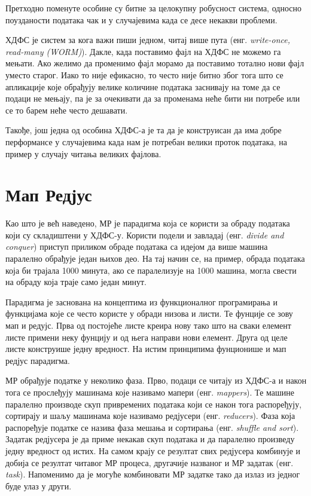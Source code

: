 \documentclass[12pt,oneside]{memoir}
\begin{document}
Претходно поменуте особине су битне за целокупну робусност система, односно поузданости података чак и у случајевима када се десе некакви проблеми.

ХДФС је систем за кога важи пиши једном, читај више пута (енг. \textit{write-once, read-many (WORM)}). Дакле, када поставимо фајл на ХДФС не можемо га мењати. Ако желимо да променимо фајл морамо да поставимо тотално нови фајл уместо старог. Иако то није ефикасно, то често није битно због тога што се апликације које обрађују велике количине података заснивају на томе да се подаци не мењају, па је за очекивати да за променама неће бити ни потребе или се то барем неће често дешавати. \cite{hadoop_beginner}


Такође, још једна од особина ХДФС-а је та да је конструисан да има добре перформансе у случајевима када нам је потребан велики проток података, на пример у случају читања великих фајлова. \cite{hadoop_beginner}


\section{Мап Редјус}
\label{sec:mr}

Као што је већ наведено, МР је парадигма која се користи за обраду података који су складиштени у ХДФС-у. Користи подели и завладај (енг. \textit{divide and conquer}) приступ приликом обраде података са идејом да више машина паралелно обрађује један њихов део. На тај начин се, на пример, обрада података која би трајала 1000 минута, ако се паралелизује на 1000 машина, могла свести на обраду која траје само један минут. \cite{hadoop_beginner}

Парадигма је заснована на концептима из функционалног програмирања и функцијама које се често користе у обради низова и листи. Те фунције се зову мап и редујс. Прва од постојеће листе креира нову тако што на сваки елемент листе примени неку фунцију и од њега направи нови елемент. Друга од целе листе конструише једну вредност. На истим принципима фунционише и мап редјус парадигма.

МР обрађује податке у неколико фаза. Прво, подаци се читају из ХДФС-а и након тога се прослеђују машинама које називамо мапери (енг. \textit{mappers}). Те машине паралелно производе скуп привремених података који се након тога распоређују, сортирају и шаљу машинама које називамо редјусери (енг. \textit{reducers}). Фаза која распоређује податке се назива фаза мешања и сортирања (енг. \textit{shuffle and sort}). Задатак редјусера је да приме некакав скуп података и да паралелно произведу једну вредност од истих. На самом крају се резултат свих редјусера комбинује и добија се резултат читавог МР процеса, другачије названог и МР задатак (енг. \textit{task}). Напоменимо да је могуће комбиновати МР задатке тако да излаз из једног буде улаз у други. \cite{hadoop_learning}
\end{document}
